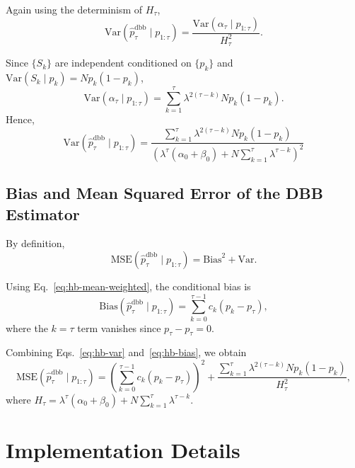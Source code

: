 Again using the determinism of $H_\tau$,
\begin{equation}
\mathrm{Var}\!\left(\hat{p}_\tau^{\mathrm{dbb}} \mid p_{1:\tau}\right)
=
\frac{\mathrm{Var}(\alpha_\tau \mid p_{1:\tau})}{H_\tau^2}.
\end{equation}

Since $\{S_k\}$ are independent conditioned on $\{p_k\}$ and
$\mathrm{Var}(S_k \mid p_k)=N p_k(1-p_k)$,
\begin{equation}
\mathrm{Var}(\alpha_\tau \mid p_{1:\tau})
=
\sum_{k=1}^{\tau} \lambda^{2(\tau-k)} N p_k(1-p_k).
\end{equation}
Hence,
\begin{equation}
\boxed{
\mathrm{Var}\!\left(\hat{p}_\tau^{\mathrm{dbb}} \mid p_{1:\tau}\right)
=
\frac{\sum_{k=1}^{\tau} \lambda^{2(\tau-k)} N p_k(1-p_k)}
{\left(\lambda^\tau(\alpha_0+\beta_0)+N \sum_{k=1}^{\tau} \lambda^{\tau-k}\right)^2}
}
\label{eq:hb-var}
\end{equation}

\subsection{Bias and Mean Squared Error of the DBB Estimator}

By definition,
\begin{equation}
\mathrm{MSE}\!\left(\hat{p}_\tau^{\mathrm{dbb}} \mid p_{1:\tau}\right)
=
\mathrm{Bias}^2 + \mathrm{Var}.
\end{equation}

Using Eq.~\eqref{eq:hb-mean-weighted}, the conditional bias is
\begin{equation}
\boxed{
\mathrm{Bias}\!\left(\hat{p}_\tau^{\mathrm{dbb}} \mid p_{1:\tau}\right)
=
\sum_{k=0}^{\tau-1} c_k (p_k-p_\tau),
}
\label{eq:hb-bias}
\end{equation}
where the $k=\tau$ term vanishes since $p_\tau-p_\tau=0$.

Combining Eqs.~\eqref{eq:hb-var} and~\eqref{eq:hb-bias}, we obtain
\begin{equation}
\boxed{
\mathrm{MSE}\!\left(\hat{p}_\tau^{\mathrm{dbb}} \mid p_{1:\tau}\right)
=
\left(
\sum_{k=0}^{\tau-1} c_k (p_k-p_\tau)
\right)^2
+
\frac{\sum_{k=1}^{\tau} \lambda^{2(\tau-k)} N p_k(1-p_k)}{H_\tau^2},
}
\label{eq:hb-mse}
\end{equation}
where $H_\tau=\lambda^\tau(\alpha_0+\beta_0)+N \sum_{k=1}^{\tau} \lambda^{\tau-k}$.


\section{Implementation Details}
\label{ap:A}

